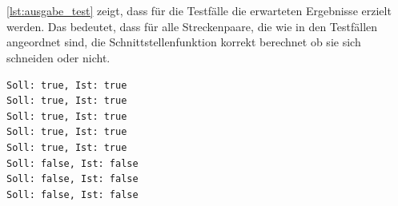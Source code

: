 \documentclass[12pt]{scrartcl}
\begin{document}
\ \\~\\
\autoref{lst:ausgabe_test} zeigt, dass für die Testfälle die erwarteten Ergebnisse erzielt werden.
Das bedeutet, dass für alle Streckenpaare, die wie in den Testfällen angeordnet sind, die Schnittstellenfunktion korrekt berechnet ob sie sich schneiden oder nicht.\\

\begin{lstlisting}[style=Terminal, caption={testing.cpp: Ausgabe Konsole},captionpos=b, label={lst:ausgabe_test}]
Soll: true, Ist: true
Soll: true, Ist: true
Soll: true, Ist: true
Soll: true, Ist: true
Soll: true, Ist: true
Soll: false, Ist: false
Soll: false, Ist: false
Soll: false, Ist: false
\end{lstlisting}
\end{document}
